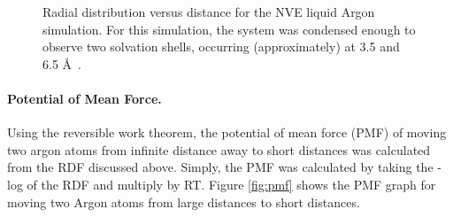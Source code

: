 \documentclass[12pt, letterpaper]{article}
\begin{document}
\begin{figure} [p]
	\centering
	\caption{Radial distribution versus distance for the NVE liquid Argon simulation. For this simulation, the system was condensed enough to observe two solvation shells, occurring (approximately) at 3.5 and 6.5 \AA\ .}
	\label{fig:rdf}
\end{figure}

\paragraph{Potential of Mean Force.}
Using the reversible work theorem, the potential of mean force (PMF) of moving two argon atoms from infinite distance away to short distances was calculated from the RDF discussed above. Simply, the PMF was calculated by taking the -log of the RDF and multiply by RT. Figure \ref{fig:pmf} shows the PMF graph for moving two Argon atoms from large distances to short distances. 
\end{document}
